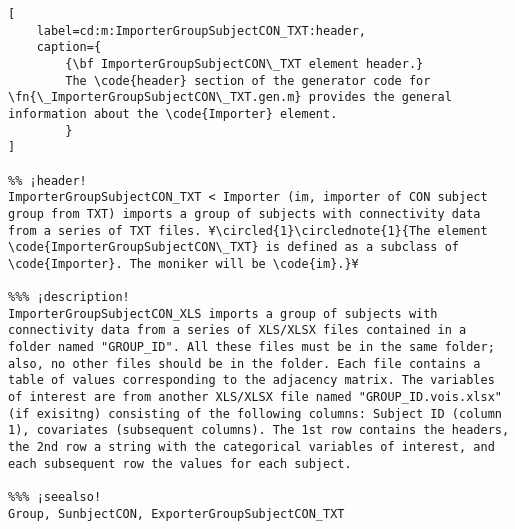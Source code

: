 \documentclass{tufte-handout}
\begin{document}
\begin{lstlisting}[
	label=cd:m:ImporterGroupSubjectCON_TXT:header,
	caption={
		{\bf ImporterGroupSubjectCON\_TXT element header.}
		The \code{header} section of the generator code for \fn{\_ImporterGroupSubjectCON\_TXT.gen.m} provides the general information about the \code{Importer} element.
		}
]

%% ¡header!
ImporterGroupSubjectCON_TXT < Importer (im, importer of CON subject group from TXT) imports a group of subjects with connectivity data from a series of TXT files. ¥\circled{1}\circlednote{1}{The element \code{ImporterGroupSubjectCON\_TXT} is defined as a subclass of \code{Importer}. The moniker will be \code{im}.}¥

%%% ¡description!
ImporterGroupSubjectCON_XLS imports a group of subjects with connectivity data from a series of XLS/XLSX files contained in a folder named "GROUP_ID". All these files must be in the same folder; also, no other files should be in the folder. Each file contains a table of values corresponding to the adjacency matrix. The variables of interest are from another XLS/XLSX file named "GROUP_ID.vois.xlsx" (if exisitng) consisting of the following columns: Subject ID (column 1), covariates (subsequent columns). The 1st row contains the headers, the 2nd row a string with the categorical variables of interest, and each subsequent row the values for each subject.

%%% ¡seealso!
Group, SunbjectCON, ExporterGroupSubjectCON_TXT

\end{lstlisting}
\end{document}
